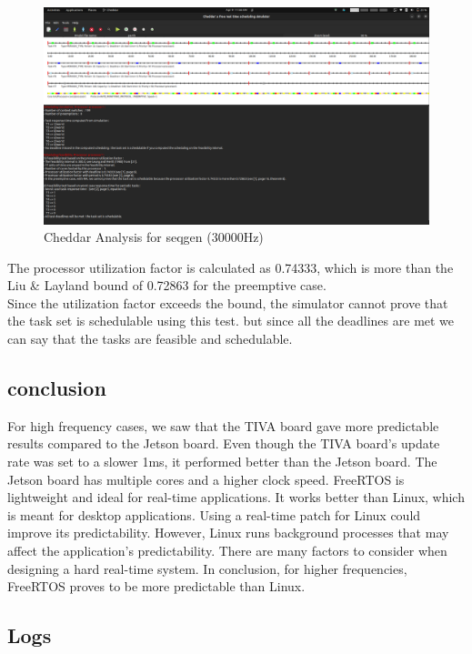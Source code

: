 \documentclass[a4paper,11pt]{article}%
\newenvironment{qanda}{\setlength{\parindent}{0pt}}{\bigskip}
\begin{document}
\begin{qanda}
			\begin{figure}[H]
				\centering
				\includegraphics[scale=0.25]{figures/seqgen3000Hz.png}
				\caption{Cheddar Analysis for seqgen (30000Hz)}

			\end{figure}

			The processor utilization factor is calculated as 0.74333, which is more than the Liu \& Layland bound of 0.72863 for the preemptive case.\\
Since the utilization factor exceeds the bound, the simulator cannot prove that the task set is schedulable using this test. but since all the deadlines are met we can say that the tasks are feasible and schedulable.\\
			\subsection{conclusion}

			For high frequency cases, we saw that the TIVA board gave more predictable results compared to the Jetson board. Even though the TIVA board's update rate was set to a slower 1ms, it performed better than the Jetson board. The Jetson board has multiple cores and a higher clock speed. FreeRTOS is lightweight and ideal for real-time applications. It works better than Linux, which is meant for desktop applications. Using a real-time patch for Linux could improve its predictability. However, Linux runs background processes that may affect the application's predictability. There are many factors to consider when designing a hard real-time system. In conclusion, for higher frequencies, FreeRTOS proves to be more predictable than Linux.




			\subsection{Logs}


\end{qanda}
\end{document}
